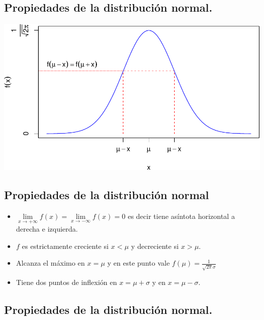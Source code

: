 \documentclass[]{book}
\providecommand{\tightlist}{%
  \setlength{\itemsep}{0pt}\setlength{\parskip}{0pt}}
\begin{document}
\hypertarget{propiedades-de-la-distribuciuxf3n-normal.-1}{%
\subsection{Propiedades de la distribución normal.}\label{propiedades-de-la-distribuciuxf3n-normal.-1}}

\begin{center}\includegraphics{curso-probabilidad-udemy_files/figure-latex/unnamed-chunk-99-1} \end{center}

\hypertarget{propiedades-de-la-distribuciuxf3n-normal}{%
\subsection{Propiedades de la distribución normal}\label{propiedades-de-la-distribuciuxf3n-normal}}

\begin{itemize}
\tightlist
\item
  \(\lim\limits_{x\to+\infty}f(x)=\lim\limits_{x\to-\infty}f(x)=0\) es decir tiene asíntota horizontal a derecha e izquierda.
\item
  \(f\) es estrictamente creciente si \(x<\mu\) y decreciente si \(x>\mu\).
\item
  Alcanza el máximo en \(x=\mu\) y en este punto vale \(f(\mu)=\frac1{\sqrt{2\pi}\sigma}\)
\item
  Tiene dos puntos de inflexión en \(x=\mu+\sigma\) y en \(x=\mu-\sigma\).
\end{itemize}

\hypertarget{propiedades-de-la-distribuciuxf3n-normal.-2}{%
\subsection{Propiedades de la distribución normal.}\label{propiedades-de-la-distribuciuxf3n-normal.-2}}
\end{document}
